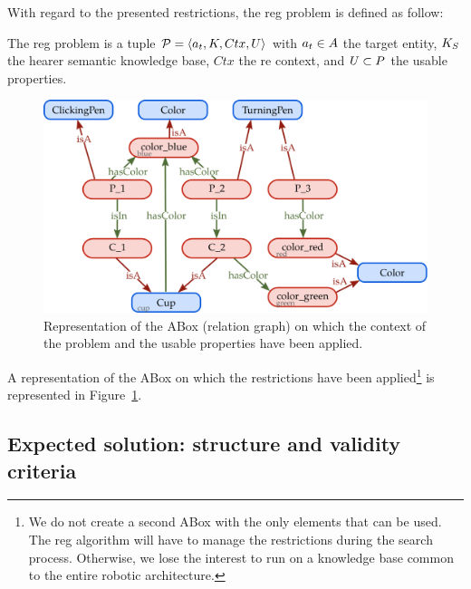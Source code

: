 With regard to the presented restrictions, the \acrshort{reg} problem is defined as follow:

\begin{definition}
The \acrshort{reg} problem is a tuple $\mathcal{P} = \langle a_t, K, Ctx, U \rangle$ with $a_t \in A$ the target entity, $K_S$ the hearer semantic knowledge base, $Ctx$ the \acrshort{re} context, and $U \subset P$ the usable properties.
\end{definition}

\begin{figure}[ht!]
\centering
\includegraphics[scale=0.4]{figures/chapter4/pens_ctx.png}
\caption{\label{fig:chap4_kb_ctx} Representation of the ABox (relation graph) on which the context of the problem and the usable properties have been applied. }
\end{figure}

\newpage

A representation of the ABox on which the restrictions have been applied\footnote{We do not create a second ABox with the only elements that can be used. The \acrshort{reg} algorithm will have to manage the restrictions during the search process. Otherwise, we lose the interest to run on a knowledge base common to the entire robotic architecture.} is represented in Figure~\ref{fig:chap4_kb_ctx}.

\subsection{Expected solution: structure and validity criteria}

